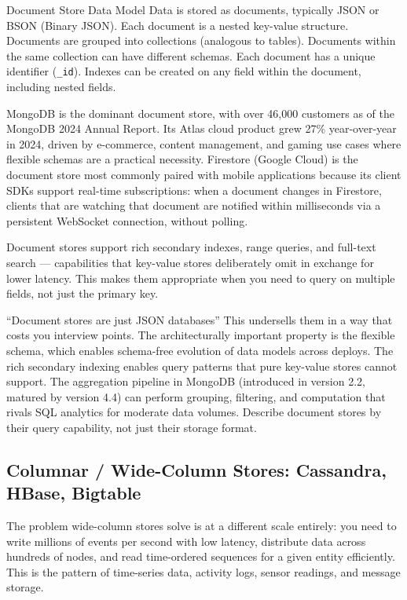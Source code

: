 \documentclass[11pt,a4paper]{article}
\begin{document}
\begin{termbox}{Document Store Data Model}
Data is stored as documents, typically JSON or BSON (Binary JSON). Each document is a nested key-value structure. Documents are grouped into collections (analogous to tables). Documents within the same collection can have different schemas. Each document has a unique identifier (\texttt{\_id}). Indexes can be created on any field within the document, including nested fields.
\end{termbox}

MongoDB is the dominant document store, with over 46,000 customers as of the MongoDB 2024 Annual Report. Its Atlas cloud product grew 27\% year-over-year in 2024, driven by e-commerce, content management, and gaming use cases where flexible schemas are a practical necessity. Firestore (Google Cloud) is the document store most commonly paired with mobile applications because its client SDKs support real-time subscriptions: when a document changes in Firestore, clients that are watching that document are notified within milliseconds via a persistent WebSocket connection, without polling.

Document stores support rich secondary indexes, range queries, and full-text search --- capabilities that key-value stores deliberately omit in exchange for lower latency. This makes them appropriate when you need to query on multiple fields, not just the primary key.

\begin{trapbox}{``Document stores are just JSON databases''}
This undersells them in a way that costs you interview points. The architecturally important property is the flexible schema, which enables schema-free evolution of data models across deploys. The rich secondary indexing enables query patterns that pure key-value stores cannot support. The aggregation pipeline in MongoDB (introduced in version 2.2, matured by version 4.4) can perform grouping, filtering, and computation that rivals SQL analytics for moderate data volumes. Describe document stores by their query capability, not just their storage format.
\end{trapbox}

\subsection{Columnar / Wide-Column Stores: Cassandra, HBase, Bigtable}

The problem wide-column stores solve is at a different scale entirely: you need to write millions of events per second with low latency, distribute data across hundreds of nodes, and read time-ordered sequences for a given entity efficiently. This is the pattern of time-series data, activity logs, sensor readings, and message storage.
\end{document}
